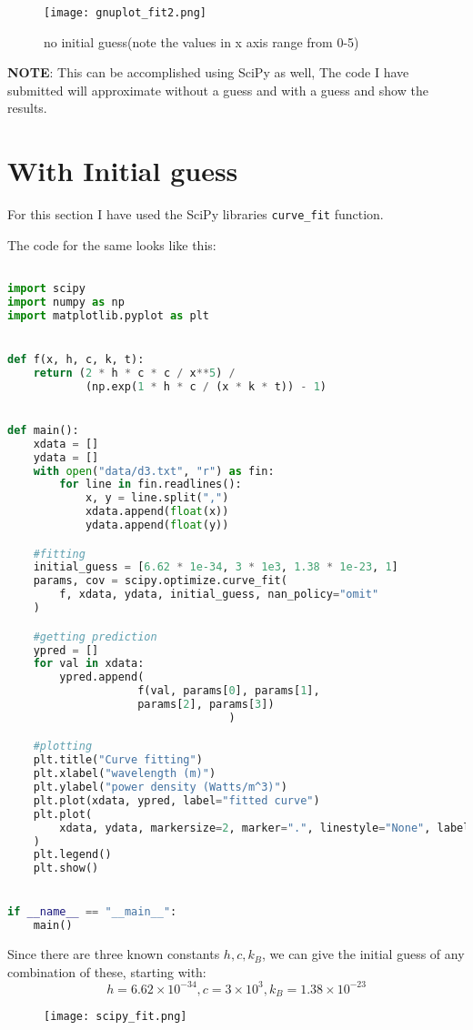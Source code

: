 \documentclass{report}
\begin{document}
\begin{figure}[!h]
	\centering
	\texttt{[image: gnuplot\_fit2.png]}
    \caption{no initial guess(note the values in x axis range from 0-5)}
\end{figure}

\FloatBarrier
\textbf{NOTE}: This can be accomplished using SciPy as well, The code I have submitted will approximate without a guess and with a guess and show the results. 
\section*{With Initial guess}
For this section I have used the SciPy libraries \texttt{curve\_fit} function.

The code for the same looks like this: 
\begin{lstlisting}[language=Python]

import scipy
import numpy as np
import matplotlib.pyplot as plt


def f(x, h, c, k, t):
    return (2 * h * c * c / x**5) / 
			(np.exp(1 * h * c / (x * k * t)) - 1)


def main():
    xdata = []
    ydata = []
    with open("data/d3.txt", "r") as fin:
        for line in fin.readlines():
            x, y = line.split(",")
            xdata.append(float(x))
            ydata.append(float(y))

    #fitting
    initial_guess = [6.62 * 1e-34, 3 * 1e3, 1.38 * 1e-23, 1]
    params, cov = scipy.optimize.curve_fit(
        f, xdata, ydata, initial_guess, nan_policy="omit"
    )

    #getting prediction	
    ypred = []
    for val in xdata:
        ypred.append(
					f(val, params[0], params[1], 
				    params[2], params[3])
							      )

    #plotting
    plt.title("Curve fitting")
    plt.xlabel("wavelength (m)")
    plt.ylabel("power density (Watts/m^3)")
    plt.plot(xdata, ypred, label="fitted curve")
    plt.plot(
        xdata, ydata, markersize=2, marker=".", linestyle="None", label="data sample"
    )
    plt.legend()
    plt.show()


if __name__ == "__main__":
    main()

\end{lstlisting}
Since there are three known constants $h, c, k_B$, we can give the initial guess of any combination of these, starting with:
\[h=6.62\times10^{-34}, c=3\times10^3, k_B=1.38\times10^{-23}\]
\begin{figure}[!h]
	\centering
	\texttt{[image: scipy\_fit.png]}
\end{figure}
\end{document}
